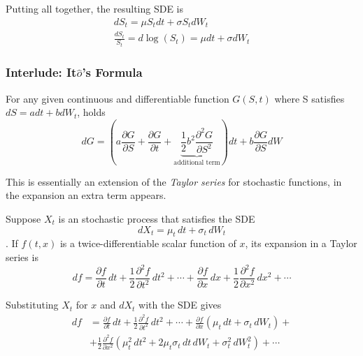 \documentclass[12pt,a4paper]{book}
\begin{document}
Putting all together, the resulting SDE is
\begin{equation}
\begin{gathered}
dS_t = \mu S_t dt + \sigma S_t dW_t \\
\frac{dS_t}{S_t} = d\log(S_t) = \mu dt + \sigma dW_t
\end{gathered}
\label{eq:log_normal_sde}
\end{equation}

\subsubsection{Interlude: It$\hat{o}$'s Formula}
For any given continuous and differentiable function $G(S,t)$ where S satisfies $dS=adt + bdW_t$, holds
\begin{equation}
dG = \left(a\frac{\partial G}{\partial S} + \frac{\partial G}{\partial t} + \underbrace{\frac{1}{2}b^2\frac{\partial^2 G}{\partial S^2}}_{\text{additional term}}\right)dt + b\frac{\partial G}{\partial S} dW
\label{eq:itos_lemma}
\end{equation}
			
This is essentially an extension of the \emph{Taylor series} for stochastic functions, in the expansion an extra term appears.	

Suppose $X_t$ is an stochastic process that satisfies the SDE
\begin{equation*}	
dX_{t}=\mu _{t}\,dt+\sigma _{t}\,dW_{t}
\end{equation*}.
If $f(t,x)$ is a twice-differentiable scalar function of $x$, its expansion in a Taylor series is
\begin{equation*}
df={\frac {\partial f}{\partial t}}\,dt+{\frac {1}{2}}{\frac {\partial ^{2}f}{\partial t^{2}}}\,dt^{2}+\cdots +{\frac {\partial f}{\partial x}}\,dx+{\frac {1}{2}}{\frac {\partial ^{2}f}{\partial x^{2}}}\,dx^{2}+\cdots
\end{equation*}

Substituting $X_t$ for $x$ and $dX_t$ with the SDE gives
\begin{equation*}
\begin{aligned}
df&={\frac {\partial f}{\partial t}}\,dt+{\frac {1}{2}}{\frac {\partial ^{2}f}{\partial t^{2}}}\,dt^{2}+\cdots +{\frac {\partial f}{\partial x}}(\mu _{t}\,dt+\sigma _{t}\,dW_{t})+\\
&+{\frac {1}{2}}{\frac {\partial ^{2}f}{\partial x^{2}}}\left(\mu _{t}^{2}\,dt^{2}+2\mu _{t}\sigma _{t}\,dt\,dW_{t}+\sigma _{t}^{2}\,dW_{t}^{2}\right)+\cdots
\end{aligned}
\end{equation*}
\end{document}
